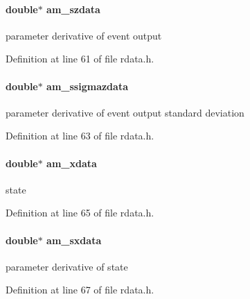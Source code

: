 \paragraph[{am\+\_\+szdata}]{\setlength{\rightskip}{0pt plus 5cm}double$\ast$ am\+\_\+szdata}\label{struct_return_data_a8191e336c3631c7e32882e1ce560f953}
parameter derivative of event output 

Definition at line 61 of file rdata.\+h.

\hypertarget{struct_return_data_aacb72a03b1cb6b4c9e8d4fde06afd109}{}
\paragraph[{am\+\_\+ssigmazdata}]{\setlength{\rightskip}{0pt plus 5cm}double$\ast$ am\+\_\+ssigmazdata}\label{struct_return_data_aacb72a03b1cb6b4c9e8d4fde06afd109}
parameter derivative of event output standard deviation 

Definition at line 63 of file rdata.\+h.

\hypertarget{struct_return_data_ad99b08eb835733c2416a1a0004e4a491}{}
\paragraph[{am\+\_\+xdata}]{\setlength{\rightskip}{0pt plus 5cm}double$\ast$ am\+\_\+xdata}\label{struct_return_data_ad99b08eb835733c2416a1a0004e4a491}
state 

Definition at line 65 of file rdata.\+h.

\hypertarget{struct_return_data_a84576ca797cb9aedbbc5a366c52f54c9}{}
\paragraph[{am\+\_\+sxdata}]{\setlength{\rightskip}{0pt plus 5cm}double$\ast$ am\+\_\+sxdata}\label{struct_return_data_a84576ca797cb9aedbbc5a366c52f54c9}
parameter derivative of state 

Definition at line 67 of file rdata.\+h.

\hypertarget{struct_return_data_a24568582aa8de699ea1ce53323ff26ca}{}

